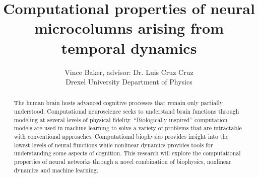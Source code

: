 \documentclass[a4paper,11pt]{article}
\title{Computational properties of neural microcolumns arising from temporal dynamics}
\author{Vince Baker, advisor: Dr. Luis Cruz Cruz\\ Drexel University Department of Physics}
\begin{document}
\maketitle

\begin{abstract}
 The human brain hosts advanced cognitive processes that remain only partially understood.
Computational neuroscience seeks to understand brain functions through modeling at several levels of physical fidelity.
``Biologically inspired'' computation models are used in machine learning to solve a variety of problems that are intractable with conventional approaches.
Computational biophysics provides insight into the lowest levels of neural functions while nonlinear dynamics provides tools for understanding some aspects of cognition.
This research will explore the computational properties of neural networks through a novel combination of biophysics, nonlinear dynamics and machine learning.
\end{abstract}
\end{document}
